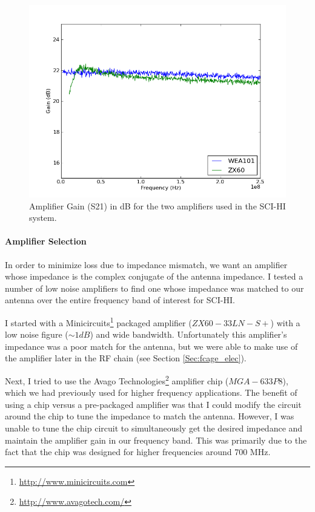 \begin{figure}[htb]
\begin{center}
\includegraphics[width=0.9\linewidth]{SCIHI_system/figures/amp_Gain_dB.png}
\caption{Amplifier Gain (S21) in dB for the two amplifiers used in the SCI-HI system. }
\label{Fig:amp_gain}
\end{center}
\end{figure}

\paragraph{Amplifier Selection}

In order to minimize loss due to impedance mismatch, we want an amplifier whose impedance is the complex conjugate of the antenna impedance. I tested a number of low noise amplifiers to find one whose impedance was matched to our antenna over the entire frequency band of interest for SCI-HI. 

I started with a Minicircuits\footnote{\url{http://www.minicircuits.com}} packaged amplifier ($ZX60 - 33 LN - S+$) with a low noise figure ($\sim 1 dB$) and wide bandwidth. Unfortunately this amplifier's impedance was a poor match for the antenna, but we were able to make use of the amplifier later in the RF chain (see Section \ref{Sec:fcage_elec}). 

Next, I tried to use the Avago Technologies\footnote{\url{http://www.avagotech.com/}} amplifier chip ($MGA-633P8$), which we had previously used for higher frequency applications. The benefit of using a chip versus a pre-packaged amplifier was that I could modify the circuit around the chip to tune the impedance to match the antenna. However, I was unable to tune the chip circuit to simultaneously get the desired impedance and maintain the amplifier gain in our frequency band. This was primarily due to the fact that the chip was designed for higher frequencies around 700 MHz. 

